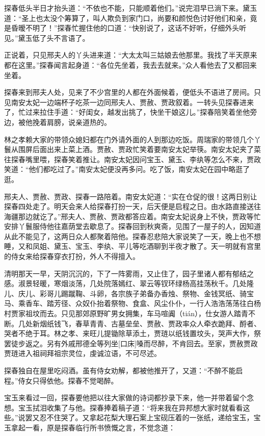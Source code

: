 \documentclass[12pt,oneside]{book}
\begin{document}
探春低头半日才抬头道：“不依也不能，只能顺着他们。”说完泪早已淌下来。黛玉道：“圣上也太没个筹算了，叫人欺负到家门口，尚要和颜悦色讨好他们和亲，竟是昏暧不明了！”探春忙握住他的口道：“快别说了，这话不好听，仔细外头听见。”黛玉低了头不言语了。

正说着，只见邢夫人的丫头进来道：“大太太叫三姑娘去他那里。我找了半天原来都在这里。”探春闻言起身道：“各位先坐着，我去去就来。”众人看他去了又都回来坐着。

探春来到邢夫人处，见来了不少宫里的人都在外面候着，便低头不语进了房间。只见南安太妃一边端杯子吃茶一边同邢夫人、贾赦、贾政叙着。一转头见探春进来了，忙过来拉住手道：“好闺女，越发出挑了，快坐干娘这儿。”探春陪笑着坐他旁边，被他挽着肩膀，说亲道热的。

林之孝赖大家的带领众媳妇都在门外请外面的人到那边吃饭。周瑞家的带领几个丫鬟从围屏后面出来上菜上酒。贾赦、贾政忙笑着要南安太妃举筷。南安太妃夹了菜往探春嘴里喂，探春笑着推让。南安太妃因问宝玉、黛玉、李纨等怎么不来，贾政笑道：“他们都吃过了。”南安太妃便没再多问。吃了饭，南安太妃在园中略逛了逛。

邢夫人、贾赦、贾政、探春一路陪着。南安太妃道：“实在仓促的很！这两日别让探春四处走了。明天会来人给探春打扮一天，后天便是启程之日。由水路直接送往海疆那边就讫了。”邢夫人、贾赦、贾政都答应着。南安太妃说身上不快，贾政等忙安排丫鬟服侍他往嘉荫堂去歇息了。探春回到秋爽斋，见围了一屋子的人，因知道从此不能见了，这两日众人都聚着陪他。探春忍悲陪大家说笑了一天，晚上也不想睡，又和凤姐、黛玉、宝玉、李纨、平儿等吃酒聊到半夜才散了。天一明就有宫里的侍女来给探春穿衣打扮，外人不得擅入。

清明那天一早，天阴沉沉的，下了一阵雾雨，又止住了，园子里诸人都有郁结之感。淑景轻暖，寒烟淡荡，几处院落嫣红、翠云等钗环绿杨高挂荡秋千。几处隆儿、庆儿、彩哥儿踢蹴鞠、斗卵，各宗族子弟备办香烛、祭物、金钱冥纸、骑宝马、乘香车、踏芳径、众奴仆抬着祭物、食盒、风尘仆仆，一行人浩浩荡荡往白杨村贾家祖坟而去。只见那郊原野旷男女拥集，车马喧阗（tián），仕女游人踏青不断。几处新烟纸钱飞，春草青青、古墓垒垒、贾赦、贾政率众人牵衣跪拜、酹者、哭者不绝于耳。林之孝、来旺儿提锄除草添土，贾琏以纸钱置坟头，哭声大作，祭罢徒步返之。另有外戚邢德全等列坐[口床]嗓而尽醉，不肯回去。至家，贾赦贾政贾琏进入祖祠拜祖宗灵位，虔诚泣语，不可尽述。

探春独自在屋里吃闷酒。虽有侍女劝解，都被他推开了，又道：“不醉不能启程。”侍女只得依他。探春不觉喝醉。

宝玉来看过一回，探春要他把以往大家做的诗词都抄录下来，他一并带着留个念想。宝玉拭泪收集了与他。探春捧着稿子道：“将来我在异邦想大家时就看看这些。”说罢又忍不住哭了。又拿起花梨大理石案上宝砚压着的一张纸，递给宝玉，宝玉拿起一看，原是探春临行所书愤慨之言，不觉念道：
\end{document}
